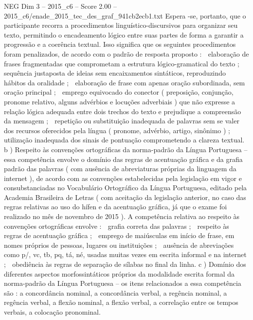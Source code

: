 \begin{textsample}{NEG Dim 3 – 2015\_c6 – Score 2.00 – 2015\_c6/enade\_2015\_tec\_des\_graf\_941cb2ecb1.txt}
Espera -se, portanto, que o participante recorra a procedimentos linguístico-discursivos para organizar seu texto, permitindo o encadeamento lógico entre suas partes de forma a garantir a progressão e a coerência textual.
Isso significa que os seguintes procedimentos foram penalizados, de acordo com o padrão de resposta proposto :  elaboração de frases fragmentadas que comprometam a estrutura lógico-gramatical do texto ;  sequência justaposta de ideias sem encaixamentos sintáticos, reproduzindo hábitos da oralidade ;  elaboração de frase com apenas oração subordinada, sem oração principal ;  emprego equivocado do conector ( preposição, conjunção, pronome relativo, alguns advérbios e locuções adverbiais ) que não expresse a relação lógica adequada entre dois trechos do texto e prejudique a compreensão da mensagem ;  repetição ou substituição inadequada de palavras sem se valer dos recursos oferecidos pela língua ( pronome, advérbio, artigo, sinônimo ) ;  utilização inadequada dos sinais de pontuação comprometendo a clareza textual. b ) Respeito às convenções ortográficas da norma-padrão da Língua Portuguesa – essa competência envolve o domínio das regras de acentuação gráfica e da grafia padrão das palavras ( com ausência de abreviaturas próprias da linguagem da internet ), de acordo com as convenções estabelecidas pela legislação em vigor e consubstanciadas no Vocabulário Ortográfico da Língua Portuguesa, editado pela Academia Brasileira de Letras ( com aceitação da legislação anterior, no caso das regras relativas ao uso do hífen e da acentuação gráfica, já que o exame foi realizado no mês de novembro de 2015 ).
A competência relativa ao respeito às convenções ortográficas envolve :  grafia correta das palavras ;  respeito às regras de acentuação gráfica ;  emprego de maiúsculas em início de frase, em nomes próprios de pessoas, lugares ou instituições ;  ausência de abreviações como p/, vc, tb, pq, tá, né, usadas muitas vezes em escrita informal e na internet ;  obediência às regras de separação de sílabas no final da linha. c ) Domínio dos diferentes aspectos morfossintáticos próprios da modalidade escrita formal da norma-padrão da Língua Portuguesa – os itens relacionados a essa competência são : a concordância nominal, a concordância verbal, a regência nominal, a regência verbal, a flexão nominal, a flexão verbal, a correlação entre os tempos verbais, a colocação pronominal.

\end{textsample}
